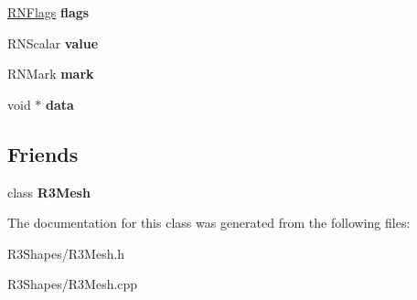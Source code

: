 \begin{DoxyCompactItemize}
\item 
\hyperlink{class_r_n_flags}{R\+N\+Flags} {\bfseries flags}\hypertarget{class_r3_mesh_face_ad87ac4c930bc5fb4e6ac6421e211c131}{}\label{class_r3_mesh_face_ad87ac4c930bc5fb4e6ac6421e211c131}

\item 
R\+N\+Scalar {\bfseries value}\hypertarget{class_r3_mesh_face_a22174b01d303008c5f0d46e41309f5c9}{}\label{class_r3_mesh_face_a22174b01d303008c5f0d46e41309f5c9}

\item 
R\+N\+Mark {\bfseries mark}\hypertarget{class_r3_mesh_face_a61cd66499a4573cc5ae9b12f6a5e2470}{}\label{class_r3_mesh_face_a61cd66499a4573cc5ae9b12f6a5e2470}

\item 
void $\ast$ {\bfseries data}\hypertarget{class_r3_mesh_face_ac8e6c54a71b1821fe405f1c3660d52b0}{}\label{class_r3_mesh_face_ac8e6c54a71b1821fe405f1c3660d52b0}

\end{DoxyCompactItemize}
\subsection*{Friends}
\begin{DoxyCompactItemize}
\item 
class {\bfseries R3\+Mesh}\hypertarget{class_r3_mesh_face_ad14836d445f783f84efa263168bb3167}{}\label{class_r3_mesh_face_ad14836d445f783f84efa263168bb3167}

\end{DoxyCompactItemize}


The documentation for this class was generated from the following files\+:\begin{DoxyCompactItemize}
\item 
R3\+Shapes/R3\+Mesh.\+h\item 
R3\+Shapes/R3\+Mesh.\+cpp\end{DoxyCompactItemize}
